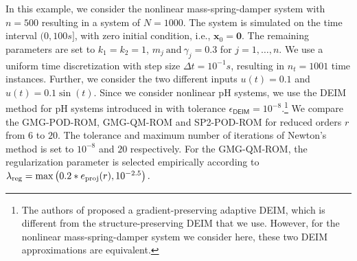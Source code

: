 \documentclass{article}
\newcommand{\statex}{{\bm x}}
\newcommand{\bzero}{\mathbf{0}}
\newcommand{\FOMsize}{N}
\newcommand{\ROMsize}{r}
\newcommand{\FOMsizeHalf}{n}
\newcommand{\pH}{\textsf{pH}\xspace}
\newcommand{\GMG}{\textsf{GMG}\xspace}
\newcommand{\QM}{\textsf{QM}\xspace} %
\newcommand{\DEIM}{\textsf{DEIM}\xspace}
\newcommand{\POD}{\textsf{POD}\xspace}
\newcommand{\ROM}{\textsf{ROM}\xspace}
\newcommand{\SPQuad}{\textsf{SP2}\xspace}
\begin{document}
	In this example, we consider the nonlinear mass-spring-damper system with $\FOMsizeHalf = 500$ resulting in a system of $\FOMsize = 1000$. The system is simulated on the time interval $(0,100s]$, with zero initial condition, i.e., $\statex_0 = \bzero$. The remaining parameters are set to $k_1= k_2 =1$, $m_j\ \mathrm{and}\ \gamma_j = 0.3$ for $j = 1,\ldots, \FOMsizeHalf$. We use a uniform time discretization with step size $\Delta t =10^{-1}s$, resulting in $n_t=1001$ time instances. Further, we consider the two different inputs $u(t) =0.1$ and $u(t) = 0.1\sin(t)$.
	Since we consider nonlinear \pH systems, we use the \DEIM method for \pH systems introduced in \cite{chaturantabut2016structure} with tolerance $\epsilon_{\DEIM}= 10^{-8}$.\footnote{The authors of \cite{pagliantini2023gradient} proposed a gradient-preserving adaptive DEIM, which is different from the structure-preserving \DEIM that we use. However, for the nonlinear mass-spring-damper system we consider here, these two \DEIM approximations are equivalent.}
	We compare the \GMG-\POD-\ROM, \GMG-\QM-\ROM and \SPQuad-\POD-\ROM for reduced orders $\ROMsize$ from $6$ to $20$. The tolerance and maximum number of iterations of Newton's method is set to $10^{-8}$ and $20$ respectively. For the \GMG-\QM-\ROM, the regularization parameter is selected empirically according to
	$
	\lambda_{\rm reg} = \max\left(0.2*e_{\rm proj}(r),10^{-2.5}\right).
	$
\end{document}
